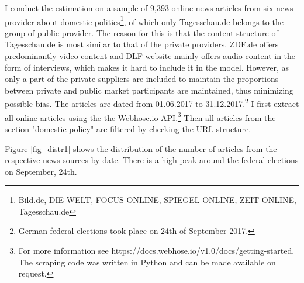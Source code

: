 \documentclass[12pt,a4paper,notitlepage]{article}
\begin{document}
I conduct the estimation on a sample of 9,393 online news articles from six news provider about domestic politics\footnote{Bild.de, DIE WELT, FOCUS ONLINE, SPIEGEL ONLINE, ZEIT ONLINE, Tagesschau.de}, of which only Tagesschau.de belongs to the group of public provider. The reason for this is that the content structure of Tagesschau.de is most similar to that of the private providers. ZDF.de offers predominantly video content and DLF website mainly offers audio content in the form of interviews, which makes it hard to include it in the model. However, as only a part of the private suppliers are included to maintain the proportions between private and public market participants are maintained, thus minimizing possible bias. The articles are dated from 01.06.2017 to 31.12.2017.\footnote{German federal elections took place on 24th of September 2017.} I first extract all online articles using the the Webhose.io API.\footnote{For more information see https://docs.webhose.io/v1.0/docs/getting-started. The scraping code was written in Python and can be made available on request.} Then all articles from the section "domestic policy" are filtered by checking the URL structure.

Figure \ref{fig_distr1} shows the distribution of the number of articles from the respective news sources by date. There is a high peak around the federal elections on September, 24th.  
\end{document}
